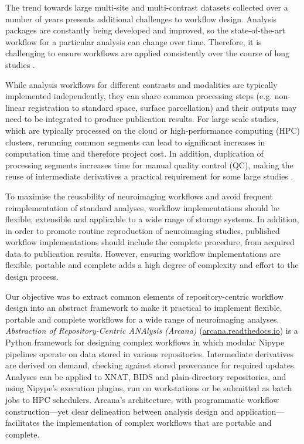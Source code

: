 \documentclass[smallextended]{svjour3}       %
\begin{document}
The trend towards large multi-site and multi-contrast datasets collected
over a number of years \citep{van_essen_human_2012,thompson_enigma_2014,sudlow_uk_2015}
presents additional challenges to workflow design.
Analysis packages are constantly being developed and improved, so the
state-of-the-art workflow for a particular analysis can change over
time. Therefore, it is challenging to ensure workflows are applied
consistently over the course of long studies \citep{cusack_automatic_2015}.

While analysis workflows for different contrasts and modalities are
typically implemented independently, they can share common processing
steps (e.g. non-linear registration to standard space, surface
parcellation) and their outputs may need to be integrated to produce
publication results. For large scale studies, which are typically
processed on the cloud or high-performance computing (HPC) clusters,
rerunning common segments can lead to significant increases in
computation time and therefore project cost. In addition, duplication of
processing segments increases time for manual quality control (QC),
making the reuse of intermediate derivatives a practical requirement for
some large studies \citep{schreiber_using_2018}.

To maximise the reusability of neuroimaging workflows and avoid frequent
reimplementation of standard analyses, workflow implementations should
be flexible, extensible and applicable to a wide range of storage
systems. In addition, in order to promote routine reproduction of
neuroimaging studies, published workflow implementations should include
the complete procedure, from acquired data to publication results.
However, ensuring workflow implementations are flexible, portable and
complete adds a high degree of complexity and effort to the design
process.

Our objective was to extract common elements of repository-centric
workflow design into an abstract framework to make it practical to
implement flexible, portable and complete workflows for a wide range of
neuroimaging analyses. \emph{Abstraction of Repository-Centric ANAlysis
(Arcana)} (\url{arcana.readthedocs.io}) is a Python framework for
designing complex workflows in which modular Nipype pipelines operate on
data stored in various repositories. Intermediate derivatives are
derived on demand, checking against stored provenance for required
updates. Analyses can be applied to XNAT, BIDS and plain-directory
repositories, and using Nipype's execution plugins, run on workstations
or be submitted as batch jobs to HPC schedulers. Arcana's architecture,
with programmatic workflow construction---yet clear delineation between
analysis design and application---facilitates the implementation of
complex workflows that are portable and complete.
\end{document}
